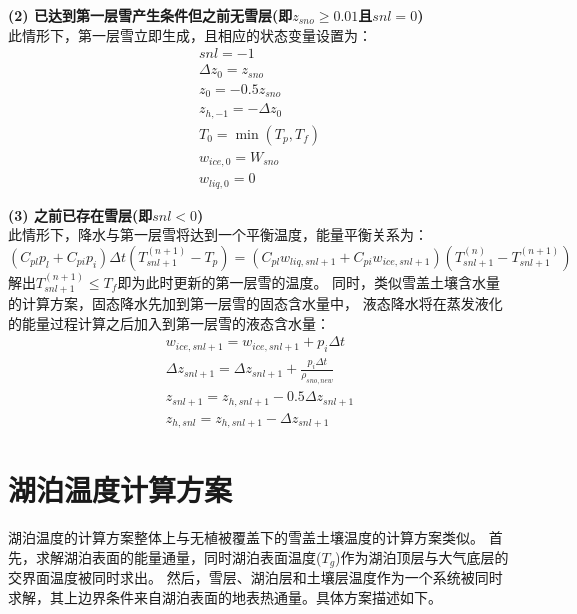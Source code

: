 \textbf {(2) 已达到第一层雪产生条件但之前无雪层(即$z_{sno}\geq0.01$且$snl=0$)}\\
此情形下，第一层雪立即生成，且相应的状态变量设置为：
\begin{equation}
\begin{array}{c}
    s n l=-1 \\
    \Delta z_{0}=z_{sno} \\
    z_{0}=-0.5 z_{sno} \\
    z_{h,-1}=-\Delta z_{0} \\
    T_{0}=\min \left(T_{p}, T_{f}\right) \\
    w_{ice, 0}=W_{sno} \\
    w_{liq, 0}=0
\end{array}
\end{equation}


\textbf {(3) 之前已存在雪层(即$snl<0$)}\\
此情形下，降水与第一层雪将达到一个平衡温度，能量平衡关系为：
\begin{equation}
\left(C_{p l} p_{l}+C_{p i} p_{i}\right) \Delta t\left(T_{s n l+1}^{(n+1)}-T_{p}\right)=
\left(C_{p l} w_{liq, s n l+1}+C_{p i} w_{ice, s n l+1}\right)\left(T_{s n l+1}^{(n)}-T_{s n l+1}^{(n+1)}\right)
\end{equation}
解出$T_{snl+1}^{\left(n+1\right)}\le T_f$即为此时更新的第一层雪的温度。
同时，类似雪盖土壤含水量的计算方案，固态降水先加到第一层雪的固态含水量中，
液态降水将在蒸发液化的能量过程计算之后加入到第一层雪的液态含水量：
\begin{equation}
\begin{array}{c}
    w_{ice, s n l+1}=w_{ice, s n l+1}+p_{i} \Delta t \\
    \Delta z_{s n l+1}=\Delta z_{s n l+1}+\frac{p_{i} \Delta t}{\rho_{sno,new}} \\
    z_{s n l+1}=z_{h, s n l+1}-0.5 \Delta z_{s n l+1} \\ 
    z_{h, s n l}=z_{h, s n l+1}-\Delta z_{s n l+1}
\end{array}
\end{equation}

\section{湖泊温度计算方案}
湖泊温度的计算方案整体上与无植被覆盖下的雪盖土壤温度的计算方案类似。
首先，求解湖泊表面的能量通量，同时湖泊表面温度($T_g$)作为湖泊顶层与大气底层的交界面温度被同时求出。
然后，雪层、湖泊层和土壤层温度作为一个系统被同时求解，其上边界条件来自湖泊表面的地表热通量。具体方案描述如下。

